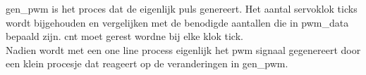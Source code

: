 
gen\_pwm is het proces dat de eigenlijk puls genereert. Het aantal servoklok ticks wordt bijgehouden en vergelijken met de benodigde aantallen die in pwm\_data bepaald zijn. cnt moet gerest wordne bij elke klok tick.\\
Nadien wordt met een one line process eigenlijk het pwm signaal gegenereert door een klein procesje dat reageert op de veranderingen in gen\_pwm.

